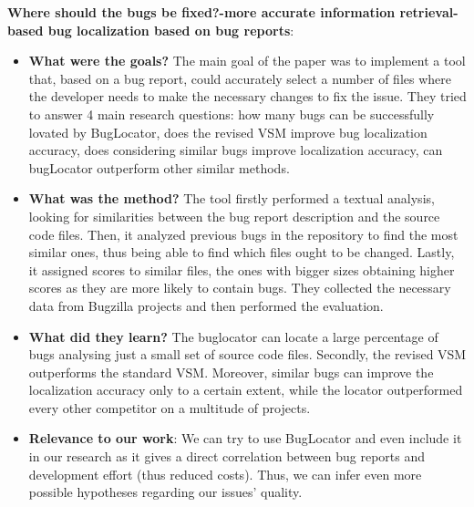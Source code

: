 \documentclass{mprop}
\begin{document}
\textbf{Where should the bugs be fixed?-more accurate information retrieval-based bug localization based on bug reports}\cite{zhou2012should}:
\begin{itemize}
  \item \textbf{What were the goals?}
  The main goal of the paper was to implement a tool that, based on a bug report, could accurately select a number of files where the developer needs to make the necessary changes to fix the issue. They tried to answer 4 main research questions: how many bugs can be successfully lovated by BugLocator, does the revised VSM improve bug localization accuracy, does considering similar bugs improve localization accuracy, can bugLocator outperform other similar methods. 
  \item \textbf{What was the method?}
  The tool firstly performed a textual analysis, looking for similarities between the bug report description and the source code files. Then, it analyzed previous bugs in the repository to find the most similar ones, thus being able to find which files ought to be changed. Lastly, it assigned scores to similar files, the ones with bigger sizes obtaining higher scores as they are more likely to contain bugs. They collected the necessary data from Bugzilla projects and then performed the evaluation. 
  \item \textbf{What did they learn?}
  The buglocator can locate a large percentage of bugs analysing just a small set of source code files. Secondly, the revised VSM outperforms the standard VSM. Moreover, similar bugs can improve the localization accuracy only to a certain extent, while the locator outperformed every other competitor on a multitude of projects. 
  \item \textbf{Relevance to our work}:
  We can try to use BugLocator and even include it in our research as it gives a direct correlation between bug reports and development effort (thus reduced costs). Thus, we can infer even more possible hypotheses regarding our issues’ quality. 
\end{itemize}
\end{document}
